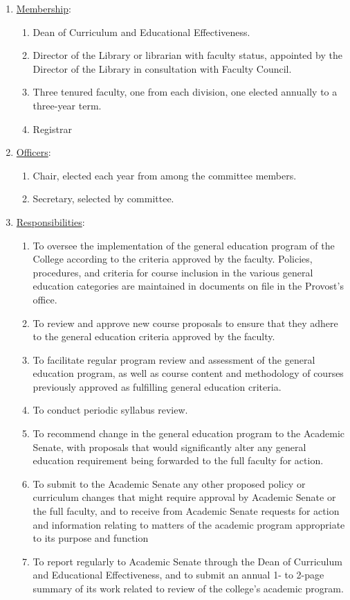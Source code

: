 					\begin{enumerate}[label=\alph*)]
						\item{\underline{Membership}:
							\begin{enumerate}[label=\arabic*)]
								\item{Dean of Curriculum and Educational Effectiveness.}
								\item{Director of the Library or librarian with faculty status, appointed by the Director of the Library in consultation with Faculty Council.}
								\item{Three tenured faculty, one from each division, one elected annually to a three-year term.}
								\item{Registrar}
							\end{enumerate}
						}
						\item{\underline{Officers}:
							\begin{enumerate}[label=\arabic*)]
								\item{Chair, elected each year from among the committee members.}
								\item{Secretary, selected by committee.}
							\end{enumerate}
						}
						\item{\underline{Responsibilities}:
							\begin{enumerate}[label=\arabic*)]
								\item{To oversee the implementation of the general education program of the College according to the criteria approved by the faculty.  Policies, procedures, and criteria for course inclusion in the various general education categories are maintained in documents on file in the Provost's office.}
								\item{To review and approve new course proposals to ensure that they adhere to the general education criteria approved by the faculty.}
								\item{To facilitate regular program review and assessment of the general education program, as well as course content and methodology of courses previously approved as fulfilling general education criteria.}
								\item{To conduct periodic syllabus review.}
								\item{To recommend change in the general education program to the Academic Senate, with proposals that would significantly alter any general education requirement being forwarded to the full faculty for action.}
								\item{To submit to the Academic Senate any other proposed policy or curriculum changes that might require approval by Academic Senate or the full faculty, and to receive from Academic Senate requests for action and information relating to matters of the academic program appropriate to its purpose and function}
								\item{To report regularly to Academic Senate through the Dean of Curriculum and Educational Effectiveness, and to submit an annual 1- to 2-page summary of its work related to review of the college's academic program.}
							\end{enumerate}
						}
					\end{enumerate}
